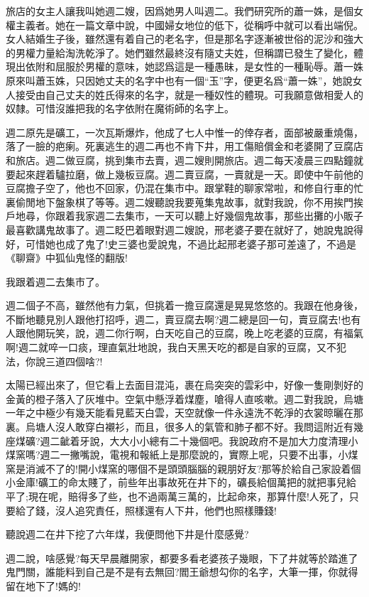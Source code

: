 \documentclass[a6paper]{article}
\begin{document}
旅店的女主人讓我叫她週二嫂，因爲她男人叫週二。我們研究所的蕭一姝，是個女權主義者。她在一篇文章中說，中國婦女地位的低下，從稱呼中就可以看出端倪。女人結婚生子後，雖然還有着自己的老名字，但是那名字逐漸被世俗的泥沙和強大的男權力量給淘洗乾淨了。她們雖然最終沒有隨丈夫姓，但稱謂已發生了變化，體現出依附和屈服於男權的意味，她認爲這是一種愚昧，是女性的一種恥辱。蕭一姝原來叫蕭玉姝，只因她丈夫的名字中也有一個“玉”字，便更名爲“蕭一姝”，她說女人接受由自己丈夫的姓氏得來的名字，就是一種奴性的體現。可我願意做相愛人的奴隸。可惜沒誰把我的名字依附在魔術師的名字上。

週二原先是礦工，一次瓦斯爆炸，他成了七人中惟一的倖存者，面部被嚴重燒傷，落了一臉的疤瘌。死裏逃生的週二再也不肯下井，用工傷賠償金和老婆開了豆腐店和旅店。週二做豆腐，挑到集市去賣，週二嫂則開旅店。週二每天凌晨三四點鐘就要起來趕着驢拉磨，做上幾板豆腐。週二賣豆腐，一賣就是一天。即使中午前他的豆腐擔子空了，他也不回家，仍混在集市中。跟掌鞋的聊家常啦，和修自行車的忙裏偷閒地下盤象棋了等等。週二嫂聽說我要蒐集鬼故事，就對我說，你不用挨門挨戶地尋，你跟着我家週二去集市，一天可以聽上好幾個鬼故事，那些出攤的小販子最喜歡講鬼故事了。週二眨巴着眼對週二嫂說，邢老婆子要在就好了，她說鬼說得好，可惜她也成了鬼了!史三婆也愛說鬼，不過比起邢老婆子那可差遠了，不過是《聊齋》中狐仙鬼怪的翻版!

我跟着週二去集市了。

週二個子不高，雖然他有力氣，但挑着一擔豆腐還是晃晃悠悠的。我跟在他身後，不斷地聽見別人跟他打招呼，週二，賣豆腐去啊?週二總是回一句，賣豆腐去!也有人跟他開玩笑，說，週二你行啊，白天吃自己的豆腐，晚上吃老婆的豆腐，有福氣啊!週二就啐一口痰，理直氣壯地說，我白天黑天吃的都是自家的豆腐，又不犯法，你說三道四個啥?!

太陽已經出來了，但它看上去面目混沌，裹在烏突突的雲彩中，好像一隻剛剝好的金黃的橙子落入了灰堆中。空氣中懸浮着煤塵，嗆得人直咳嗽。週二對我說，烏塘一年之中極少有幾天能看見藍天白雲，天空就像一件永遠洗不乾淨的衣裳晾曬在那裏。烏塘人沒人敢穿白襯衫，而且，很多人的氣管和肺子都不好。我問這附近有幾座煤礦?週二齜着牙說，大大小小總有二十幾個吧。我說政府不是加大力度清理小煤窯嗎?週二一撇嘴說，電視和報紙上是那麼說的，實際上呢，只要不出事，小煤窯是消滅不了的!開小煤窯的哪個不是頭頭腦腦的親朋好友?那等於給自己家設着個小金庫!礦工的命太賤了，前些年出事故死在井下的，礦長給個萬把的就把事兒給平了;現在呢，賠得多了些，也不過兩萬三萬的，比起命來，那算什麼!人死了，只要給了錢，沒人追究責任，照樣還有人下井，他們也照樣賺錢!

聽說週二在井下挖了六年煤，我便問他下井是什麼感覺?

週二說，啥感覺?每天早晨離開家，都要多看老婆孩子幾眼，下了井就等於踏進了鬼門關，誰能料到自己是不是有去無回?閻王爺想勾你的名字，大筆一揮，你就得留在地下了!媽的!
\end{document}
